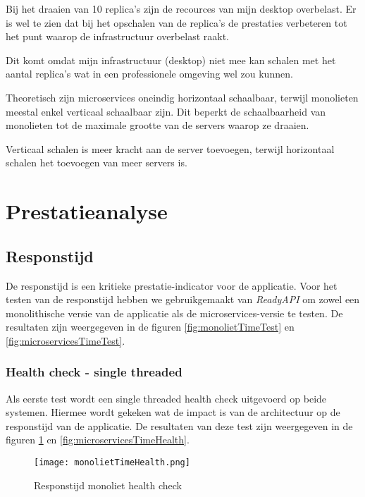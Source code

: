 Bij het draaien van 10 replica's zijn de recources van mijn desktop overbelast. Er is wel te zien dat bij het opschalen van de replica's de prestaties verbeteren tot het punt waarop de infrastructuur overbelast raakt.

Dit komt omdat mijn infrastructuur (desktop) niet mee kan schalen met het aantal replica's wat in een professionele omgeving wel zou kunnen.

Theoretisch zijn microservices oneindig horizontaal schaalbaar, terwijl monolieten meestal enkel verticaal schaalbaar zijn. Dit beperkt de schaalbaarheid van monolieten tot de maximale grootte van de servers waarop ze draaien.

Verticaal schalen is meer kracht aan de server toevoegen, terwijl horizontaal schalen het toevoegen van meer servers is.


\section{Prestatieanalyse}

\subsection{Responstijd}

De responstijd is een kritieke prestatie-indicator voor de applicatie. Voor het testen van de responstijd hebben we gebruikgemaakt van \textit{ReadyAPI} om zowel een monolithische versie van de applicatie als de microservices-versie te testen. De resultaten zijn weergegeven in de figuren \ref{fig:monolietTimeTest} en \ref{fig:microservicesTimeTest}.

\subsubsection*{Health check - single threaded}

Als eerste test wordt een single threaded health check uitgevoerd op beide systemen. Hiermee wordt gekeken wat de impact is van de architectuur op de responstijd van de applicatie. De resultaten van deze test zijn weergegeven in de figuren \ref{fig:monolietTimeHealth} en \ref{fig:microservicesTimeHealth}.

\begin{figure}[H]
    \centering	
    \texttt{[image: monolietTimeHealth.png]}
    \caption{Responstijd monoliet health check} 
    \label{fig:monolietTimeHealth}
\end{figure}

